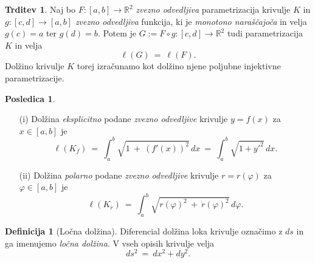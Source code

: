 \documentclass[11pt]{article}
\newcommand{\R}{\mathbb{R}}
\theoremstyle{definition}
\newtheorem{definicija}{Definicija}[section]
\theoremstyle{definition}
\newtheorem{trditev}{Trditev}[section]
\theoremstyle{definition}
\theoremstyle{theorem}
\newtheorem*{posledica}{Posledica}
\begin{document}
\begin{trditev}

Naj bo $F: [a, b] \rightarrow \R^2$ \textit{zvezno odvedljiva} parametrizacija krivulje $K$ in $g: [c, d] \rightarrow [a, b]$ \textit{zvezno odvedljiva} funkcija, ki je \textit{monotono naraščajoča} in velja $g(c) = a$ ter $g(d) = b$. Potem je $G := F \circ g: [c, d] \rightarrow \R^2$ tudi parametrizacija $K$ in velja 
$$\ell(G) ~=~ \ell(F).$$
Dolžino krivulje $K$ torej izračunamo kot dolžino njene poljubne injektivne parametrizacije.

\end{trditev}
\vspace{0.5cm}

\begin{posledica}
~
\begin{enumerate}
	\item[(i)] Dolžina \textit{eksplicitno} podane \textit{zvezno odvedljive} krivulje
	$y = f(x)$ za \hbox{$x \in [a, b]$} je
	$$\ell(K_f) ~=~ \int_a^b \sqrt{1 ~+~ (f'(x))^2}\,dx ~=~ \int_a^b \sqrt{1 + {y'}^2}\,dx.$$

	\item[(ii)] Dolžina \textit{polarno} podane \textit{zvezno odvedljive} krivulje $r = 	r(\varphi)$ za $\varphi \in [a, b]$ je
	$$\ell(K_r) ~=~ \int_a^b \sqrt{r(\varphi)^2 ~+~ \dot{r}(\varphi)^2}\,d\varphi.$$
\end{enumerate}
\end{posledica}
\vspace{0.5cm}

\begin{definicija}[Ločna dolžina]

Diferencial dolžina loka krivulje označimo z $ds$ in ga imenujemo \textit{ločna dolžina}. V vseh opisih krivulje velja 
$$ds^2 ~=~ dx^2 + dy^2.$$

\end{definicija}
\vspace{0.5cm}
\end{document}
